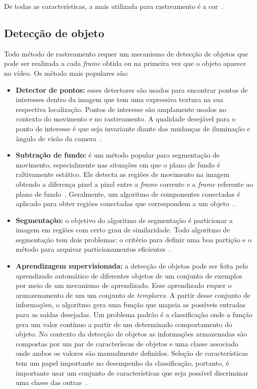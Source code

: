 De todas as características, a mais utilizada para rastreamento é a cor~\cite{yilmaz}.

\subsection{Detecção de objeto}

	Todo método de rastreamento requer um mecanismo de detecção de objetos que pode ser realizada a cada \textit{frame} obtida ou na primeira vez que o objeto aparece no vídeo. Os método mais populares são:


	\begin{itemize}
		\item \textbf{Detector de pontos:} esses detectores são usados para encontrar pontos de interesses dentro da imagem que tem uma expressiva textura na sua respectiva localização. Pontos de interesse são amplamente usados no contexto do movimento e no rastreamento. A qualidade desejável para o ponto de interesse é que seja invariante diante das mudanças de iluminação e ângulo de visão da camera~\cite{yilmaz}.
	
		\item \textbf{Subtração de fundo:} é um método popular para segmentação de movimento, especialmente nas situações em que o plano de fundo é raltivamente estático. Ele detecta as regiões de movimento na imagem obtendo a diferença pixel a pixel entre a \textit{frame} corrente e a \textit{frame} referente ao plano de fundo~\cite{weiming}. Geralmente, um algoritmo de componentes conectadas é aplicado para obter regiões conectadas que correspondem a um objeto~\cite{yilmaz}.

		\item \textbf{Segmentação:} o objetivo do algoritmo de segmentação é particionar a imagem em regiões com certo grau de similaridade. Todo algoritmo de segmentação tem dois problemas: o critério para definir uma boa partição e o método para arquivar particionamentos eficientes~\cite{yilmaz}.

		\item \textbf{Aprendizagem supervisionada:} a detecção de objetos pode ser feita pelo aprendizado automático de diferentes objetos de um conjunto de exemplos por meio de um mecanismo de aprendizado. Esse aprendizado requer o armazenamento de um um conjunto de \textit{templares}. A partir desse conjunto de informações, o algoritmo gera uma função que mapeia as possíveis entradas para as saídas desejadas. Um problema padrão é a classificação onde a função gera um valor contínuo a partir de um determinado comportamento do objeto. No contexto da detecção de objetos as informações armazenadas são compostas por um par de caracteríscas de objetos e uma classe associada onde ambos os valores são manualmente definidos. Seleção de características tem um papel importante no desempenho da classificação, portanto, é importante usar um conjunto de características que seja possível discriminar uma classe das outras~\cite{yilmaz}.
	\end{itemize}


